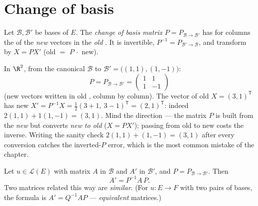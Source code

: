 \section{Change of basis}

\begin{definition}\label{def:b1:matrices:changeofbasis}
Let $\mathcal{B}, \mathcal{B}'$ be bases of $E$. The \emph{change of
basis matrix} $P =
P_{\mathcal{B}\to\mathcal{B}'}$ has for columns the  of
the \emph{new}  vectors in the \emph{old} . It is
invertible, $P^{-1} = P_{\mathcal{B}'\to\mathcal{B}}$, and
 transform by $X = PX'$ (old $=$ $P\,\cdot$ new).
\end{definition}

\begin{example}
\label{ex:b1:matrices:changerun}
In $\R^2$, from the canonical $\mathcal B$ to $\mathcal B' =
\bigl((1,1), (1,-1)\bigr)$:
\[
P = P_{\mathcal B\to\mathcal B'} =
\begin{pmatrix} 1 & 1\\ 1 & -1 \end{pmatrix}
\]
(new vectors written in old , column by column). The
vector of old  $X = (3, 1)^{\mathsf T}$ has new
 $X' = P^{-1}X = \frac12(3 + 1,\ 3 - 1)^{\mathsf T} =
(2, 1)^{\mathsf T}$: indeed $2(1,1) + 1(1,-1) = (3,1)$. Mind the
direction --- the matrix $P$ is built from the \emph{new} 
but converts \emph{new to old}  ($X = PX'$); passing
from old to new costs the inverse. Writing the sanity check
$2(1,1) + (1,-1) = (3,1)$ after every conversion catches the
inverted-$P$ error, which is the most common mistake of the
chapter.
\end{example}

\begin{theorem}\label{thm:b1:matrices:conjugation}
Let $u \in \mathcal{L}(E)$ with matrix $A$ in $\mathcal{B}$ and $A'$
in $\mathcal{B}'$, and $P = P_{\mathcal{B}\to\mathcal{B}'}$. Then
\[
A' = P^{-1} A\, P .
\]
Two matrices related this way are \emph{similar}. (For $u \colon E \to F$ with two pairs of bases, the
formula is $A' = Q^{-1} A P$ --- \emph{equivalent}
matrices.)
\end{theorem}

